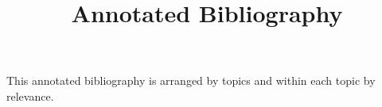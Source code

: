 \documentclass{article}[12pt]
\title{Annotated Bibliography}
\date{}
\begin{document}
\setcounter{page}{37}
\maketitle
This annotated bibliography is arranged by topics and within each topic by relevance.


\nocite{*}


\end{document}
